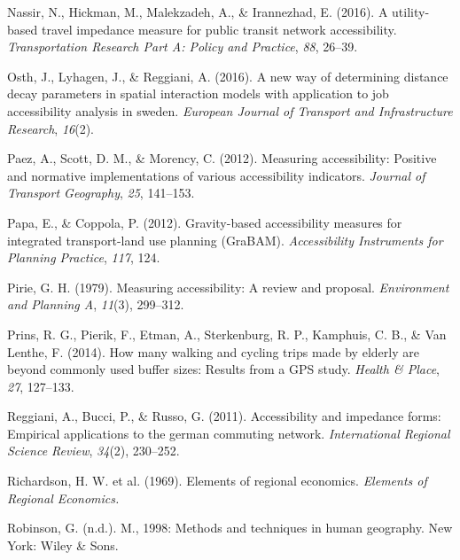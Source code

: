 \documentclass[
11pt, %
oneside, %
english, %
singlespacing, %
]{macthesis} %
\newlength{\cslhangindent}
\newenvironment{CSLReferences}[2] %
 {%
  \setlength{\parindent}{0pt}
  \ifodd #1 \everypar{\setlength{\hangindent}{\cslhangindent}}\ignorespaces\fi
  \ifnum #2 > 0
  \setlength{\parskip}{#2\baselineskip}
  \fi
 }%
 {}
\begin{document}
\begin{CSLReferences}{1}{0}
\leavevmode{}%
Nassir, N., Hickman, M., Malekzadeh, A., \& Irannezhad, E. (2016). A utility-based travel impedance measure for public transit network accessibility. \emph{Transportation Research Part A: Policy and Practice}, \emph{88}, 26--39.

\leavevmode{}%
Osth, J., Lyhagen, J., \& Reggiani, A. (2016). A new way of determining distance decay parameters in spatial interaction models with application to job accessibility analysis in sweden. \emph{European Journal of Transport and Infrastructure Research}, \emph{16}(2).

\leavevmode{}%
Paez, A., Scott, D. M., \& Morency, C. (2012). Measuring accessibility: Positive and normative implementations of various accessibility indicators. \emph{Journal of Transport Geography}, \emph{25}, 141--153.

\leavevmode{}%
Papa, E., \& Coppola, P. (2012). Gravity-based accessibility measures for integrated transport-land use planning (GraBAM). \emph{Accessibility Instruments for Planning Practice}, \emph{117}, 124.

\leavevmode{}%
Pirie, G. H. (1979). Measuring accessibility: A review and proposal. \emph{Environment and Planning A}, \emph{11}(3), 299--312.

\leavevmode{}%
Prins, R. G., Pierik, F., Etman, A., Sterkenburg, R. P., Kamphuis, C. B., \& Van Lenthe, F. (2014). How many walking and cycling trips made by elderly are beyond commonly used buffer sizes: Results from a GPS study. \emph{Health \& Place}, \emph{27}, 127--133.

\leavevmode{}%
Reggiani, A., Bucci, P., \& Russo, G. (2011). Accessibility and impedance forms: Empirical applications to the german commuting network. \emph{International Regional Science Review}, \emph{34}(2), 230--252.

\leavevmode{}%
Richardson, H. W. et al. (1969). Elements of regional economics. \emph{Elements of Regional Economics.}

\leavevmode{}%
Robinson, G. (n.d.). M., 1998: Methods and techniques in human geography. New York: Wiley \& Sons.


\end{CSLReferences}
\end{document}
